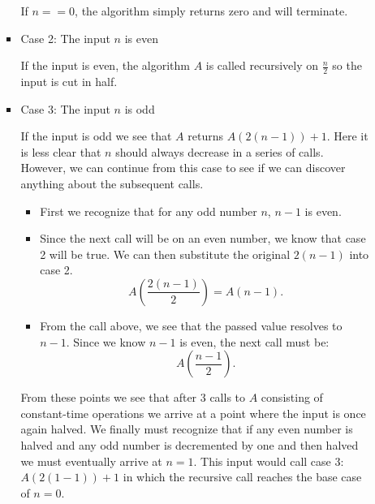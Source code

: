 \documentclass[letterpaper,11pt]{article}
\begin{document}
\begin{enumerate}
\begin{enumerate}
\begin{itemize}
                    If $n == 0$, the algorithm simply returns zero and will 
                    terminate. 

                \item Case 2: The input $n$ is even

                    If the input is even, the algorithm $A$ is called recursively
                    on $\frac{n}{2}$ so the input is cut in half.  

                \item Case 3: The input $n$ is odd

                    If the input is odd we see that $A$ returns 
                    $A(2\left( n - 1 \right)) + 1$. Here it is less clear
                    that $n$ should always decrease in a series of calls. 
                    However, we can continue from this case to see if we can 
                    discover anything about the subsequent calls.
                    
                    \begin{itemize}
                        \item First we recognize that for any odd number $n$, 
                            $n - 1$ is even. 
                        \item Since the next call will be on an even number,
                            we know that case 2 will be true. We can then 
                            substitute the original $2\left( n - 1 \right) $ 
                            into case 2.
                            \[
                                A(\frac{2\left( n - 1 \right)}{2}) = A(n-1)
                            .\] 
                        \item From the call above, we see that the passed value
                            resolves to $n-1$. Since we know $n-1$ is even,
                            the next call must be:
                             \[
                                 A\left( \frac{n-1}{2} \right) 
                            .\] 
                    \end{itemize}

                From these points we see that after 3 calls to $A$ consisting
                of constant-time operations we arrive at a point where the 
                input is once again halved. We finally must recognize that if 
                any even number is halved and any odd number is decremented by
                one and then halved we must eventually arrive at $n = 1$. This
                input would call case 3: 
                $A\left( 2\left( 1-1 \right)  \right) + 1$ in which the 
                recursive call reaches the base case of $n=0$.\\


\end{itemize}
\end{enumerate}
\end{enumerate}
\end{document}
